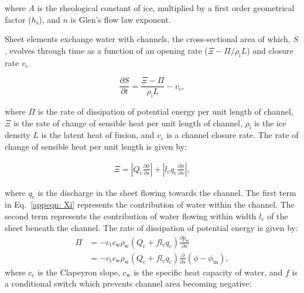 \documentclass[tc, manuscript]{copernicus}
\begin{document}
where $A$ is the rheological constant of ice, multiplied by a first order geometrical factor ($h_{\mathrm{s}}$), and $n$ is Glen's flow law exponent. 

Sheet elements exchange water with channels, the cross-sectional area of which, $S$, evolves through time as a function of an opening rate ($\Xi - \Pi/\rho_{\mathrm{i}}L$) and closure rate $v_{\mathrm{c}}$

\begin{equation}
\label{apeq:channel cross section}
\frac{\partial S}{\partial t}=\frac{\Xi-\Pi}{\rho_{\mathrm{i}} L}-v_\mathrm{c},
\end{equation}
\noindent

where $\Pi$ is the rate of dissipation of potential energy per unit length of channel, $\Xi$ is the rate of change of sensible heat per unit length of channel, $\rho_{\mathrm{i}}$ is the ice density $L$ is the latent heat of fusion, and $v_{\mathrm{c}}$ is a channel closure rate. The rate of change of sensible heat per unit length is given by: 

\begin{equation}
\label{appeqn: Xi}
\begin{aligned}
\Xi = \left|Q_{\mathrm{c}}\frac{\partial \phi}{\partial s}\right| + \left|l_{\mathrm{c}}q_{\mathrm{c}}\frac{\partial \phi}{\partial s}\right|,
\end{aligned}
\end{equation}

where $q_{\mathrm{c}}$ is the discharge in the sheet flowing towards the channel. The first term in Eq.~\ref{appeqn: Xi} represents the contribution of water within the channel. The second term represents the contribution of water flowing within width $l_{\mathrm{c}}$ of the sheet beneath the channel. The rate of dissipation of potential energy is given by: 
\begin{equation}
\label{appeqn: Pi}
\begin{aligned} 
\Pi & =-c_{\mathrm{t}} c_{\mathrm{w}} \rho_{\mathrm{w}}\left(Q_{\mathrm{c}}+f l_{\mathrm{c}} q_{\mathrm{c}}\right) \frac{\partial p_{\mathrm{w}}}{\partial s} \\ & =-c_{\mathrm{t}} c_{\mathrm{w}} \rho_{\mathrm{w}}\left(Q_{\mathrm{c}}+f l_{\mathrm{c}} q_{\mathrm{c}}\right) \frac{\partial}{\partial s}\left(\phi-\phi_{\mathrm{m}}\right),
\end{aligned}
\end{equation}
where $c_{\mathrm{c}}$ is the Clapeyron slope, $c_{\mathrm{w}}$ is the specific heat capacity of water, and $f$ is a conditional switch which prevents channel area becoming negative: 
\end{document}
